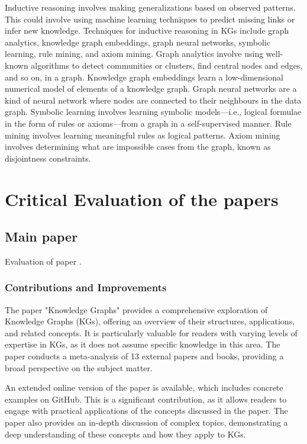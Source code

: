 \documentclass[11pt]{article} %
\begin{document}
Inductive reasoning involves making generalizations based on observed patterns. This could involve using machine learning techniques to predict missing links or infer new knowledge. Techniques for inductive reasoning in KGs include graph analytics, knowledge graph embeddings, graph neural networks, symbolic learning, rule mining, and axiom mining. Graph analytics involve using well-known algorithms to detect communities or clusters, find central nodes and edges, and so on, in a graph. Knowledge graph embeddings learn a low-dimensional numerical model of elements of a knowledge graph. Graph neural networks are a kind of neural network where nodes are connected to their neighbours in the data graph. Symbolic learning involves learning symbolic models—i.e., logical formulae in the form of rules or axioms—from a graph in a self-supervised manner. Rule mining involves learning meaningful rules as logical patterns. Axiom mining involves determining what are impossible cases from the graph, known as disjointness constraints.


\section{Critical Evaluation of the papers}

\subsection{Main paper}
Evaluation of paper .

\subsubsection*{Contributions and Improvements}

The paper "Knowledge Graphs" provides a comprehensive exploration of Knowledge Graphs (KGs), offering an overview of their structures, applications, and related concepts. It is particularly valuable for readers with varying levels of expertise in KGs, as it does not assume specific knowledge in this area. The paper conducts a meta-analysis of 13 external papers and books, providing a broad perspective on the subject matter. 

An extended online version of the paper is available, which includes concrete examples on GitHub. This is a significant contribution, as it allows readers to engage with practical applications of the concepts discussed in the paper. The paper also provides an in-depth discussion of complex topics, demonstrating a deep understanding of these concepts and how they apply to KGs. 
\end{document}
